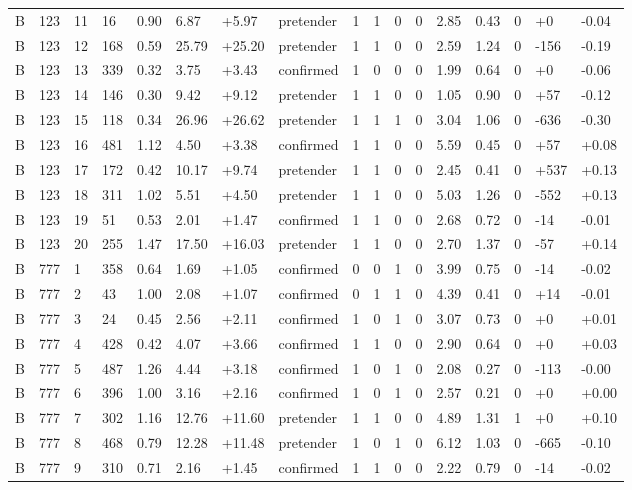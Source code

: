 \documentclass[11pt,a4paper]{article}
\begin{document}
{\begin{longtable}[]{@{}lllllllllllllllll@{}}
B & 123 & 11 & 16 & 0.90 & 6.87 & +5.97 & pretender & 1 & 1 & 0 & 0 & 2.85 & 0.43 & 0 & +0 & -0.04 \\
B & 123 & 12 & 168 & 0.59 & 25.79 & +25.20 & pretender & 1 & 1 & 0 & 0 & 2.59 & 1.24 & 0 & -156 & -0.19 \\
B & 123 & 13 & 339 & 0.32 & 3.75 & +3.43 & confirmed & 1 & 0 & 0 & 0 & 1.99 & 0.64 & 0 & +0 & -0.06 \\
B & 123 & 14 & 146 & 0.30 & 9.42 & +9.12 & pretender & 1 & 1 & 0 & 0 & 1.05 & 0.90 & 0 & +57 & -0.12 \\
B & 123 & 15 & 118 & 0.34 & 26.96 & +26.62 & pretender & 1 & 1 & 1 & 0 & 3.04 & 1.06 & 0 & -636 & -0.30 \\
B & 123 & 16 & 481 & 1.12 & 4.50 & +3.38 & confirmed & 1 & 1 & 0 & 0 & 5.59 & 0.45 & 0 & +57 & +0.08 \\
B & 123 & 17 & 172 & 0.42 & 10.17 & +9.74 & pretender & 1 & 1 & 0 & 0 & 2.45 & 0.41 & 0 & +537 & +0.13 \\
B & 123 & 18 & 311 & 1.02 & 5.51 & +4.50 & pretender & 1 & 1 & 0 & 0 & 5.03 & 1.26 & 0 & -552 & +0.13 \\
B & 123 & 19 & 51 & 0.53 & 2.01 & +1.47 & confirmed & 1 & 1 & 0 & 0 & 2.68 & 0.72 & 0 & -14 & -0.01 \\
B & 123 & 20 & 255 & 1.47 & 17.50 & +16.03 & pretender & 1 & 1 & 0 & 0 & 2.70 & 1.37 & 0 & -57 & +0.14 \\
B & 777 & 1 & 358 & 0.64 & 1.69 & +1.05 & confirmed & 0 & 0 & 1 & 0 & 3.99 & 0.75 & 0 & -14 & -0.02 \\
B & 777 & 2 & 43 & 1.00 & 2.08 & +1.07 & confirmed & 0 & 1 & 1 & 0 & 4.39 & 0.41 & 0 & +14 & -0.01 \\
B & 777 & 3 & 24 & 0.45 & 2.56 & +2.11 & confirmed & 1 & 0 & 1 & 0 & 3.07 & 0.73 & 0 & +0 & +0.01 \\
B & 777 & 4 & 428 & 0.42 & 4.07 & +3.66 & confirmed & 1 & 1 & 0 & 0 & 2.90 & 0.64 & 0 & +0 & +0.03 \\
B & 777 & 5 & 487 & 1.26 & 4.44 & +3.18 & confirmed & 1 & 0 & 1 & 0 & 2.08 & 0.27 & 0 & -113 & -0.00 \\
B & 777 & 6 & 396 & 1.00 & 3.16 & +2.16 & confirmed & 1 & 0 & 1 & 0 & 2.57 & 0.21 & 0 & +0 & +0.00 \\
B & 777 & 7 & 302 & 1.16 & 12.76 & +11.60 & pretender & 1 & 1 & 0 & 0 & 4.89 & 1.31 & 1 & +0 & +0.10 \\
B & 777 & 8 & 468 & 0.79 & 12.28 & +11.48 & pretender & 1 & 0 & 1 & 0 & 6.12 & 1.03 & 0 & -665 & -0.10 \\
B & 777 & 9 & 310 & 0.71 & 2.16 & +1.45 & confirmed & 1 & 1 & 0 & 0 & 2.22 & 0.79 & 0 & -14 & -0.02 \\

\end{longtable}}
\end{document}
